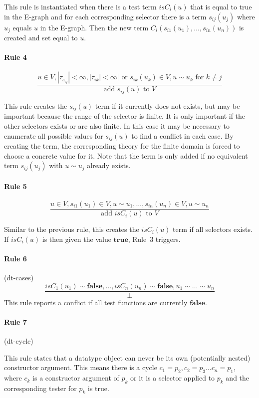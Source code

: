 \documentclass[a4paper]{article}
\newcommand\true{\mathbf{true}}
\newcommand\false{\mathbf{false}}
\newcommand\isC{\mathit{isC}}
\begin{document}
This rule is instantiated when there is a test term $\isC_i(u)$ that
is equal to true in the E-graph and for each corresponding selector there
is a term $s_{ij}(u_j)$ where $u_j$ equals $u$ in the E-graph.
Then the new term $C_i(s_{i1}(u_1),\dots,s_{in}(u_n))$ is created and set
equal to $u$.

\paragraph{Rule 4}
\[
\frac{u \in V, |\tau_{s_{ij}}| < \infty,
  |\tau_{ik}| < \infty|\text{ or }s_{ik}(u_k)\in V, u\sim u_k 
  \text{ for }k\neq j}
     {\text{add $s_{ij}(u)$ to $V$}}
\]

This rule creates the $s_{ij}(u)$ term if it currently does not
exists, but may be important because the range of the selector is
finite.  It is only important if the other selectors exists or are
also finite.  In this case it may be necessary to enumerate all
possible values for $s_{ij}(u)$ to find a conflict in each case.  By
creating the term, the corresponding theory for the finite domain is
forced to choose a concrete value for it.  Note that the term is only
added if no equivalent term $s_{ij}(u_j)$ with $u\sim u_j$ already
exists.

\paragraph{Rule 5}
\[
\frac{u \in V, s_{i1}(u_1)\in V,u\sim u_1,\dots, s_{in}(u_n)\in V, u\sim u_n}{\text{add $\isC_i(u)$ to $V$}}
\]

Similar to the previous rule, this creates the $\isC_i(u)$ term if all
selectors exists.  If $\isC_i(u)$ is then given the value $\true$,
Rule~3 triggers.


\paragraph{Rule 6} (dt-cases)
\[
\frac{\isC_1(u_1)\sim \false,\dots, \isC_n(u_n)\sim \false, u_1\sim\dots\sim u_n}{\bot}
\]
This rule reports a conflict if all test functions are currently $\false$.

\paragraph{Rule 7} (dt-cycle)

This rule states that a datatype object can never be its own (potentially nested) constructor argument.
This means there is a cycle $c_1=p_2, c_2=p_3 \dots c_n=p_1$, where $c_k$ is a constructor argument of $p_k$ or it is a selector applied to $p_k$ and the corresponding tester for $p_k$ is true.
\end{document}
